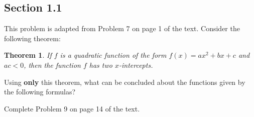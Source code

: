 \documentclass[addpoints,11pt]{exam}
\newtheorem{theorem}{Theorem}
\begin{document}
\begin{questions}
\printanswers
\section*{Section 1.1}
  \question
  This problem is adapted from Problem 7 on page 1 of the text.
  Consider the following theorem:
  \begin{theorem}
    If $f$ is a quadratic function of the form $f(x) = ax^{2} + bx + c$ and $ac < 0$, then the function $f$ has two $x$-intercepts.
  \end{theorem}
  Using \textbf{only} this theorem, what can be concluded about the functions given by the following formulas?
  \begin{solution}
  \end{solution}

  \vspace{.5cm}

  \question
  Complete Problem 9 on page 14 of the text.


\end{questions}
\end{document}
